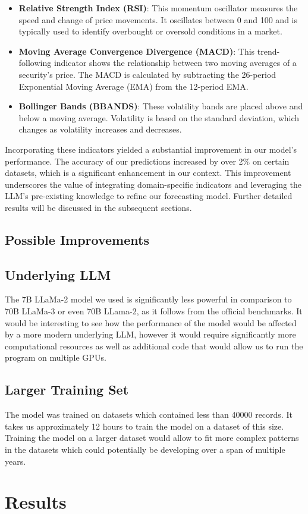 \begin{itemize}
	\item \textbf{Relative Strength Index (RSI)}: This momentum oscillator measures the speed and change of price movements. It oscillates between 0 and 100 and is typically used to identify overbought or oversold conditions in a market.
	\item \textbf{Moving Average Convergence Divergence (MACD)}: This trend-following indicator shows the relationship between two moving averages of a security's price. The MACD is calculated by subtracting the 26-period Exponential Moving Average (EMA) from the 12-period EMA.
	\item \textbf{Bollinger Bands (BBANDS)}: These volatility bands are placed above and below a moving average. Volatility is based on the standard deviation, which changes as volatility increases and decreases.
\end{itemize}

Incorporating these indicators yielded a substantial improvement in our model's performance. The accuracy of our predictions increased by over 2\% on certain datasets, which is a significant enhancement in our context. This improvement underscores the value of integrating domain-specific indicators and leveraging the LLM's pre-existing knowledge to refine our forecasting model. Further detailed results will be discussed in the subsequent sections.

\subsection{Possible Improvements}

\subsection{Underlying LLM}
The 7B LLaMa-2 model we used is significantly less powerful in comparison to 70B LLaMa-3 or even 70B LLama-2, as it follows from the official benchmarks. It would be interesting to see how the performance of the model would be affected by a more modern underlying LLM, however it would require significantly more computational resources as well as additional code that would allow us to run the program on multiple GPUs.

\subsection{Larger Training Set}
The model was trained on datasets which contained less than 40000 records. It takes us approximately 12 hours to train the model on a dataset of this size. Training the model on a larger dataset would allow to fit more complex patterns in the datasets which could potentially be developing over a span of multiple years.
\section{Results}

